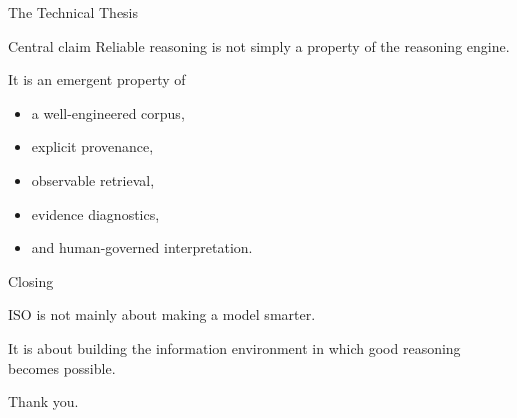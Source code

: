 \documentclass[aspectratio=169]{beamer}
\begin{document}
\begin{frame}{The Technical Thesis}

\Large

\begin{block}{Central claim}
Reliable reasoning is not simply a property of the reasoning engine.
\end{block}

\vspace{0.5cm}

It is an emergent property of

\begin{itemize}
\item a well-engineered corpus,
\item explicit provenance,
\item observable retrieval,
\item evidence diagnostics,
\item and human-governed interpretation.
\end{itemize}

\end{frame}

\begin{frame}{Closing}

\centering

\vspace{0.6cm}

{\LARGE ISO is not mainly about making a model smarter.}

\vspace{1cm}

{\LARGE It is about building the information environment in which good reasoning becomes possible.}

\vfill

{\large Thank you.}

\end{frame}

\end{document}

